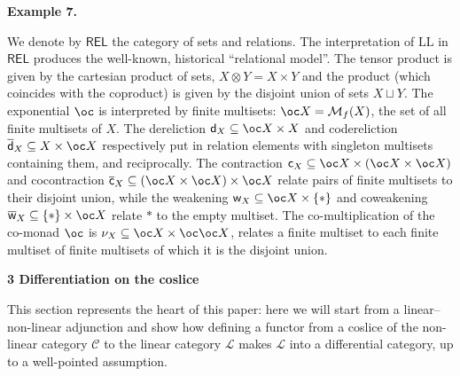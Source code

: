  
 
 
\par\medskip\noindent\textbf{Example 7.}\par
 
 
We denote by $\mathsf{REL}$ the category of sets and relations. The interpretation of $\mathrm{LL}$ in $\mathsf{REL}$ produces the well-known, historical “relational model”. The tensor product is given by the cartesian product of sets, $X\otimes Y=X\times Y$ and the product (which coincides with the coproduct) is given by the disjoint union of sets $X\sqcup Y$. The exponential $\oc$ is interpreted by finite multisets: $\oc X=\mathcal{M}_{f}(X)$, the set of all finite multisets of $X$. The dereliction ${\mathsf{d}}_{X}\subseteq\oc X\times X$ and codereliction $\overline{\mathsf{d}}_{X}\subseteq X\times\oc X$ respectively put in relation elements with singleton multisets containing them, and reciprocally. The contraction ${\mathsf{c}}_{X}\subseteq\oc X\times(\oc X\times\oc X)$ and cocontraction $\overline{\mathsf{c}}_{X}\subseteq(\oc X\times\oc X)\times\oc X$ relate pairs of finite multisets to their disjoint union, while the weakening $\mathsf{w}_{X}\subseteq\oc X\times\{\ast\}$ and coweakening $\overline{\mathsf{w}}_{X}\subseteq\{\ast\}\times\oc X$ relate $\ast$ to the empty multiset. The co-multiplication of the co-monad $\oc$ is $\nu_{X}\subseteq\oc X\times\oc\oc X$, relates a finite multiset to each finite multiset of finite multisets of which it is the disjoint union.\par
 
 
 
 


 
\par\medskip\noindent\textbf{3 Differentiation on the coslice}\par
 
 
This section represents the heart of this paper: here we will start from a linear–non-linear adjunction and show how defining a functor from a coslice of the non-linear category $\mathscr{C}$ to the linear category $\mathscr{L}$ makes $\mathscr{L}$ into a differential category, up to a well-pointed assumption.\par
 
